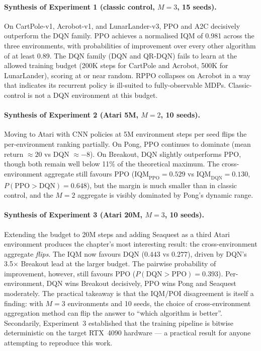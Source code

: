 \documentclass[11pt,a4paper]{article}
\begin{document}
\paragraph{Synthesis of Experiment 1 (classic control, $M=3$, 15 seeds).}
On CartPole-v1, Acrobot-v1, and LunarLander-v3, PPO and A2C decisively
outperform the DQN family. PPO achieves a normalised IQM of 0.981 across
the three environments, with probabilities of improvement over every
other algorithm of at least 0.89. The DQN family (DQN and QR-DQN) fails
to learn at the allowed training budget (200K steps for CartPole and
Acrobot, 500K for LunarLander), scoring at or near random. RPPO
collapses on Acrobot in a way that indicates its recurrent policy is
ill-suited to fully-observable MDPs. Classic-control is not a DQN
environment at this budget.

\paragraph{Synthesis of Experiment 2 (Atari 5M, $M=2$, 10 seeds).}
Moving to Atari with CNN policies at 5M environment steps per seed flips
the per-environment ranking partially. On Pong, PPO continues to
dominate (mean return $\approx 20$ vs DQN $\approx -8$). On Breakout,
DQN slightly outperforms PPO, though both remain well below 11\% of the
theoretical maximum. The cross-environment aggregate still favours PPO
($\text{IQM}_{\text{PPO}}=0.529$ vs $\text{IQM}_{\text{DQN}}=0.130$,
$P(\text{PPO}>\text{DQN})=0.648$), but the margin is much smaller than
in classic control, and the $M=2$ aggregate is visibly dominated by
Pong's dynamic range.

\paragraph{Synthesis of Experiment 3 (Atari 20M, $M=3$, 10 seeds).}
Extending the budget to 20M steps and adding Seaquest as a third Atari
environment produces the chapter's most interesting result: the
cross-environment aggregate \emph{flips}. The IQM now favours DQN
($0.443$ vs $0.277$), driven by DQN's 3.5$\times$ Breakout lead at the
larger budget. The pairwise probability of improvement, however, still
favours PPO ($P(\text{DQN}>\text{PPO})=0.393$). Per-environment, DQN
wins Breakout decisively, PPO wins Pong and Seaquest moderately. The
practical takeaway is that the IQM/POI disagreement is itself a finding:
with $M=3$ environments and 10 seeds, the choice of cross-environment
aggregation method can flip the answer to ``which algorithm is better''.
Secondarily, Experiment~3 established that the training pipeline is
bitwise deterministic on the target RTX~4090 hardware --- a practical
result for anyone attempting to reproduce this work.
\end{document}
